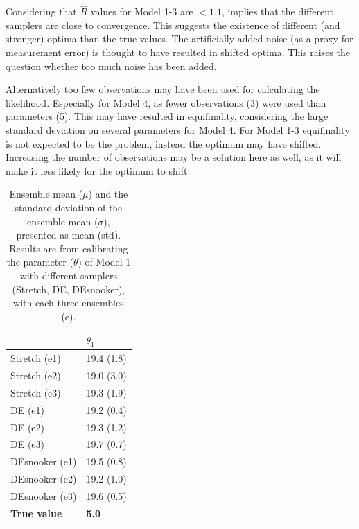 Considering that $\hat{R}$ values for Model 1-3 are $<1.1$, implies that the different samplers are close to convergence. This suggests the existence of different (and stronger) optima than the true values. The artificially added noise (as a proxy for measurement error) is thought to have resulted in shifted optima. This raises the question whether too much noise has been added. 

Alternatively too few observations may have been used for calculating the likelihood. Especially for Model 4, as fewer observations (3) were used than parameters (5). This may have resulted in equifinality, considering the large standard deviation on several parameters for Model 4. For Model 1-3 equifinality is not expected to be the problem, instead the optimum may have shifted. Increasing the number of observations may be a solution here as well, as it will make it less likely for the optimum to shift

\begin{table}[ht]
\caption{Ensemble mean ($\mu$) and the standard deviation of the ensemble mean ($\sigma$), presented as mean (std). Results are from calibrating the parameter ($\theta$) of Model 1 with different samplers (Stretch, DE, DEsnooker), with each three ensembles (e).}
\label{tab_logbook_1.2_mean1}
\begin{tabularx}{\textwidth}{XX}
\toprule
 & $\theta_1$ \\
\midrule
Stretch (e1) & 19.4 (1.8) \\
Stretch (e2) & 19.0 (3.0) \\
Stretch (e3) & 19.3 (1.9) \\
\midrule
DE (e1) & 19.2 (0.4) \\
DE (e2) & 19.3 (1.2) \\
DE (e3) & 19.7 (0.7) \\
\midrule
DEsnooker (e1) & 19.5 (0.8) \\
DEsnooker (e2) & 19.2 (1.0) \\
DEsnooker (e3) & 19.6 (0.5) \\
\midrule
\textbf{True value} & \textbf{5.0} \\
\bottomrule
\end{tabularx}
\end{table}

